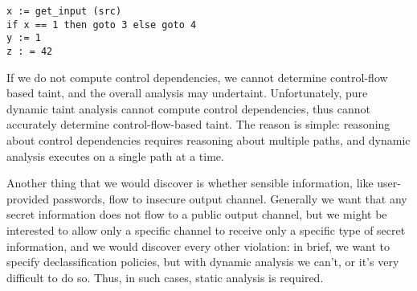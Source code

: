 \begin{lstlisting}
x := get_input (src)
if x == 1 then goto 3 else goto 4
y := 1
z : = 42
\end{lstlisting}

If we do not compute control dependencies, we cannot determine control-flow based taint, and the overall analysis may undertaint. Unfortunately, pure dynamic taint analysis cannot compute control dependencies, thus cannot accurately determine control-flow-based taint. The reason is simple: reasoning about control dependencies requires reasoning about multiple paths, and dynamic analysis executes on a single path at a time.

Another thing that we would discover is whether sensible information, like user-provided passwords, flow to insecure output channel. Generally we want that any secret information does not flow to a public output channel, but we might be interested to allow only a specific channel to receive only a specific type of secret information, and we would discover every other violation: in brief, we want to specify declassification policies, but with dynamic analysis we can't, or it's very difficult to do so. Thus, in such cases, static analysis is required.